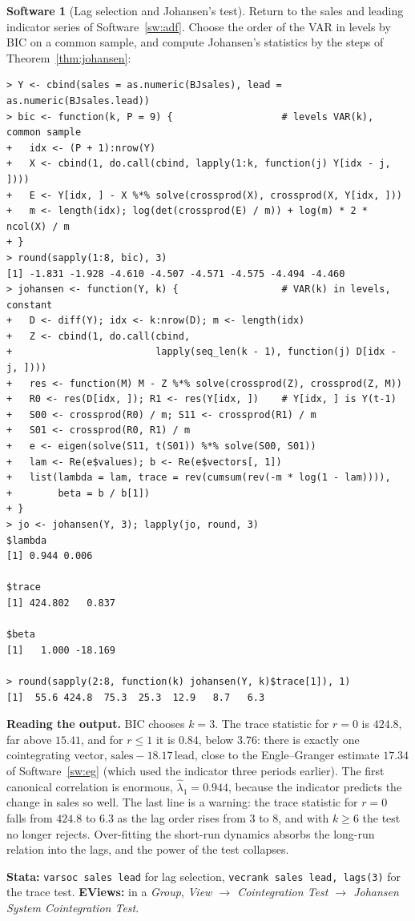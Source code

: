 \documentclass[11pt,a4paper]{article}
\numberwithin{equation}{section}
\theoremstyle{definition}
\newtheorem{software}[thm]{Software}
\begin{document}
\begin{software}[Lag selection and Johansen's test]
\label{sw:johansen}
Return to the sales and leading indicator series of Software~\ref{sw:adf}. Choose the order of the VAR in levels by BIC on a common sample, and
compute Johansen's statistics by the steps of Theorem~\ref{thm:johansen}:
{\small\begin{verbatim}
> Y <- cbind(sales = as.numeric(BJsales), lead = as.numeric(BJsales.lead))
> bic <- function(k, P = 9) {                   # levels VAR(k), common sample
+   idx <- (P + 1):nrow(Y)
+   X <- cbind(1, do.call(cbind, lapply(1:k, function(j) Y[idx - j, ])))
+   E <- Y[idx, ] - X %*% solve(crossprod(X), crossprod(X, Y[idx, ]))
+   m <- length(idx); log(det(crossprod(E) / m)) + log(m) * 2 * ncol(X) / m
+ }
> round(sapply(1:8, bic), 3)
[1] -1.831 -1.928 -4.610 -4.507 -4.571 -4.575 -4.494 -4.460
> johansen <- function(Y, k) {                  # VAR(k) in levels, constant
+   D <- diff(Y); idx <- k:nrow(D); m <- length(idx)
+   Z <- cbind(1, do.call(cbind,
+                         lapply(seq_len(k - 1), function(j) D[idx - j, ])))
+   res <- function(M) M - Z %*% solve(crossprod(Z), crossprod(Z, M))
+   R0 <- res(D[idx, ]); R1 <- res(Y[idx, ])    # Y[idx, ] is Y(t-1)
+   S00 <- crossprod(R0) / m; S11 <- crossprod(R1) / m
+   S01 <- crossprod(R0, R1) / m
+   e <- eigen(solve(S11, t(S01)) %*% solve(S00, S01))
+   lam <- Re(e$values); b <- Re(e$vectors[, 1])
+   list(lambda = lam, trace = rev(cumsum(rev(-m * log(1 - lam)))),
+        beta = b / b[1])
+ }
> jo <- johansen(Y, 3); lapply(jo, round, 3)
$lambda
[1] 0.944 0.006

$trace
[1] 424.802   0.837

$beta
[1]   1.000 -18.169

> round(sapply(2:8, function(k) johansen(Y, k)$trace[1]), 1)
[1]  55.6 424.8  75.3  25.3  12.9   8.7   6.3
\end{verbatim}}
\textbf{Reading the output.} BIC chooses $k = 3$. The trace statistic for $r = 0$ is $424.8$, far above $15.41$, and for $r \leq 1$ it is $0.84$, below $3.76$: there is exactly one
cointegrating vector, $\text{sales} - 18.17\,\text{lead}$, close to the Engle--Granger estimate $17.34$ of Software~\ref{sw:eg} (which used the indicator three periods earlier).
The first canonical correlation is enormous, $\hat\lambda_1 = 0.944$, because the indicator predicts the change in sales so well. The last line is a warning: the
trace statistic for $r = 0$ falls from $424.8$ to $6.3$ as the lag order rises from $3$ to $8$, and with $k \geq 6$ the test no longer rejects. Over-fitting the short-run
dynamics absorbs the long-run relation into the lags, and the power of the test collapses.

\textbf{Stata:} \texttt{varsoc sales lead} for lag selection, \texttt{vecrank sales lead, lags(3)} for the trace test. \textbf{EViews:} in a \emph{Group}, \emph{View $\to$
Cointegration Test $\to$ Johansen System Cointegration Test}.
\end{software}
\end{document}
